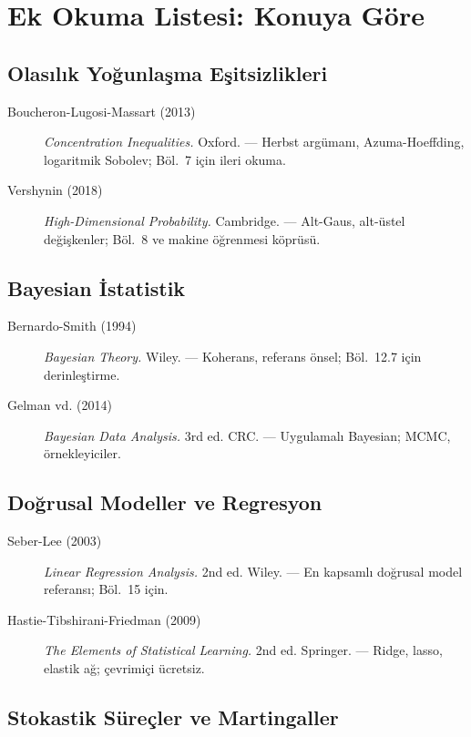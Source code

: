 \section{Ek Okuma Listesi: Konuya Göre}

\subsection{Olasılık Yoğunlaşma Eşitsizlikleri}

\begin{description}
  \item[Boucheron-Lugosi-Massart (2013)] \textit{Concentration Inequalities.} Oxford. --- Herbst argümanı, Azuma-Hoeffding, logaritmik Sobolev; Böl.~7 için ileri okuma.
  \item[Vershynin (2018)] \textit{High-Dimensional Probability.} Cambridge. --- Alt-Gaus, alt-üstel değişkenler; Böl.~8 ve makine öğrenmesi köprüsü.
\end{description}

\subsection{Bayesian İstatistik}

\begin{description}
  \item[Bernardo-Smith (1994)] \textit{Bayesian Theory.} Wiley. --- Koherans, referans önsel; Böl.~12.7 için derinleştirme.
  \item[Gelman vd. (2014)] \textit{Bayesian Data Analysis.} 3rd ed. CRC. --- Uygulamalı Bayesian; MCMC, örnekleyiciler.
\end{description}

\subsection{Doğrusal Modeller ve Regresyon}

\begin{description}
  \item[Seber-Lee (2003)] \textit{Linear Regression Analysis.} 2nd ed. Wiley. --- En kapsamlı doğrusal model referansı; Böl.~15 için.
  \item[Hastie-Tibshirani-Friedman (2009)] \textit{The Elements of Statistical Learning.} 2nd ed. Springer. --- Ridge, lasso, elastik ağ; çevrimiçi ücretsiz.
\end{description}

\subsection{Stokastik Süreçler ve Martingaller}

